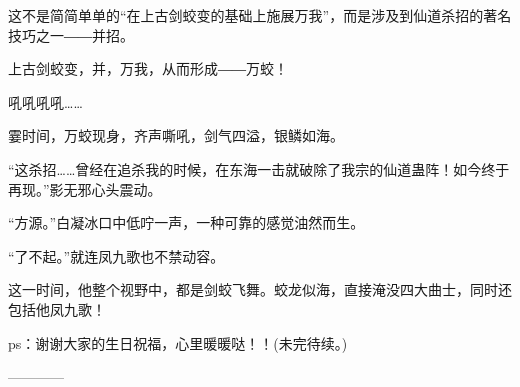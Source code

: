 \begin{this_body}
这不是简简单单的“在上古剑蛟变的基础上施展万我”，而是涉及到仙道杀招的著名技巧之一――并招。

上古剑蛟变，并，万我，从而形成――万蛟！

吼吼吼吼……

霎时间，万蛟现身，齐声嘶吼，剑气四溢，银鳞如海。

“这杀招……曾经在追杀我的时候，在东海一击就破除了我宗的仙道蛊阵！如今终于再现。”影无邪心头震动。

“方源。”白凝冰口中低咛一声，一种可靠的感觉油然而生。

“了不起。”就连凤九歌也不禁动容。

这一时间，他整个视野中，都是剑蛟飞舞。蛟龙似海，直接淹没四大曲士，同时还包括他凤九歌！

ps：谢谢大家的生日祝福，心里暖暖哒！！(未完待续。)

------------

\end{this_body}

